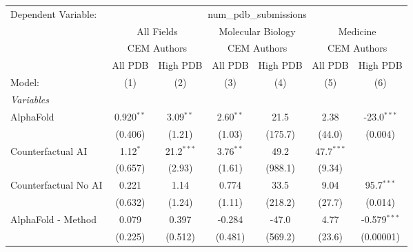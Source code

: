 \begingroup
\centering
\begin{tabular}{lcccccc}
   \tabularnewline \midrule \midrule
   Dependent Variable: & \multicolumn{6}{c}{num\_pdb\_submissions}\\
 & \multicolumn{2}{c}{All Fields} & \multicolumn{2}{c}{Molecular Biology} & \multicolumn{2}{c}{Medicine} \\
\cmidrule(lr){2-3} \cmidrule(lr){4-5} \cmidrule(lr){6-7}
 & \multicolumn{2}{c}{CEM Authors} & \multicolumn{2}{c}{CEM Authors} & \multicolumn{2}{c}{CEM Authors} \\
\cmidrule(lr){2-3} \cmidrule(lr){4-5} \cmidrule(lr){6-7}
 & \multicolumn{1}{c}{All PDB} & \multicolumn{1}{c}{High PDB} & \multicolumn{1}{c}{All PDB} & \multicolumn{1}{c}{High PDB} & \multicolumn{1}{c}{All PDB} & \multicolumn{1}{c}{High PDB} \\
\cmidrule(lr){2-2} \cmidrule(lr){3-3} \cmidrule(lr){4-4} \cmidrule(lr){5-5} \cmidrule(lr){6-6} \cmidrule(lr){7-7}
   Model:                                                     & (1)          & (2)           & (3)          & (4)     & (5)          & (6)\\  
   \midrule
   \emph{Variables}\\
   AlphaFold                                                  & 0.920$^{**}$ & 3.09$^{**}$   & 2.60$^{**}$  & 21.5    & 2.38         & -23.0$^{***}$\\   
                                                              & (0.406)      & (1.21)        & (1.03)       & (175.7) & (44.0)       & (0.004)\\   
   Counterfactual AI                                          & 1.12$^{*}$   & 21.2$^{***}$  & 3.76$^{**}$  & 49.2    & 47.7$^{***}$ &   \\   
                                                              & (0.657)      & (2.93)        & (1.61)       & (988.1) & (9.34)       &   \\   
   Counterfactual No AI                                       & 0.221        & 1.14          & 0.774        & 33.5    & 9.04         & 95.7$^{***}$\\   
                                                              & (0.632)      & (1.24)        & (1.11)       & (218.2) & (27.7)       & (0.014)\\   
   AlphaFold - Method                                         & 0.079        & 0.397         & -0.284       & -47.0   & 4.77         & -0.579$^{***}$\\   
                                                              & (0.225)      & (0.512)       & (0.481)      & (569.2) & (23.6)       & (0.00001)\\   

\end{tabular}
